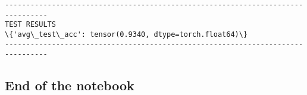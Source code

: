\documentclass[10pt]{article}
\begin{document}
    
    \begin{Verbatim}[commandchars=\\\{\}]
--------------------------------------------------------------------------------
TEST RESULTS
\{'avg\_test\_acc': tensor(0.9340, dtype=torch.float64)\}
--------------------------------------------------------------------------------

    \end{Verbatim}

    \hypertarget{end-of-the-notebook}{%
\subsection*{End of the notebook}\label{end-of-the-notebook}}


    
    
    
\end{document}
